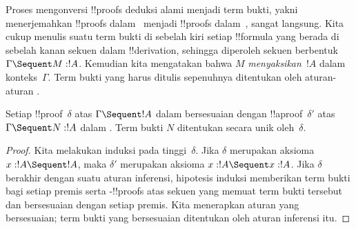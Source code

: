 \documentclass[../../../include/open-logic-section]{subfiles}
\begin{document}


Proses mengonversi !!{proof}s deduksi alami menjadi term bukti, yakni
menerjemahkan !!{proof}s dalam~ menjadi !!{proof}s
dalam~, sangat langsung. Kita cukup menulis suatu term bukti di
sebelah kiri setiap !!{formula} yang berada di sebelah kanan sekuen dalam
!!{derivation}, sehingga diperoleh sekuen berbentuk $\Gamma \Sequent M :
!A$. Kemudian kita mengatakan bahwa $M$ \emph{menyaksikan}~$!A$ dalam
konteks~$\Gamma$. Term bukti yang harus ditulis sepenuhnya ditentukan oleh
aturan-aturan .

\begin{prop}
Setiap !!{proof}~$\delta$ atas $\Gamma \Sequent !A$ dalam 
bersesuaian dengan !!a{proof}~$\delta'$ atas $\Gamma \Sequent N : !A$
dalam . Term bukti $N$ ditentukan secara unik oleh~$\delta$.
\end{prop}

\begin{proof}
Kita melakukan induksi pada tinggi~$\delta$. Jika $\delta$ merupakan
aksioma $x:!A \Sequent !A$, maka $\delta'$ merupakan aksioma
$x:!A \Sequent x:!A$. Jika $\delta$ berakhir dengan suatu aturan inferensi,
hipotesis induksi memberikan term bukti bagi setiap premis serta
-!!{proof}s atas sekuen yang memuat term bukti tersebut dan
bersesuaian dengan setiap premis. Kita menerapkan aturan  yang
bersesuaian; term bukti yang bersesuaian ditentukan oleh aturan inferensi
 itu.
\end{proof}
\end{document}
